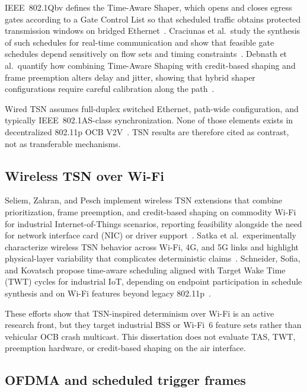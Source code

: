 IEEE~802.1Qbv defines the Time-Aware Shaper, which opens and closes egress gates according to a Gate Control List so that scheduled traffic obtains protected transmission windows on bridged Ethernet~\cite{ieee8021qbv}.
Craciunas et al.\ study the synthesis of such schedules for real-time communication and show that feasible gate schedules depend sensitively on flow sets and timing constraints~\cite{craciunas2016}.
Debnath et al.\ quantify how combining Time-Aware Shaping with credit-based shaping and frame preemption alters delay and jitter, showing that hybrid shaper configurations require careful calibration along the path~\cite{debnath2023mixed,modeling}.

Wired TSN assumes full-duplex switched Ethernet, path-wide configuration, and typically IEEE~802.1AS-class synchronization.
None of those elements exists in decentralized 802.11p OCB V2V~\cite{jiang2008ieee80211p,ieee8021qbv}.
TSN results are therefore cited as contrast, not as transferable mechanisms.

\subsection{Wireless TSN over Wi-Fi}
\label{sec:rw:wireless-tsn}

Seliem, Zahran, and Pesch implement wireless TSN extensions that combine prioritization, frame preemption, and credit-based shaping on commodity Wi-Fi for industrial Internet-of-Things scenarios, reporting feasibility alongside the need for network interface card (NIC) or driver support~\cite{seliem2023wirelesstsn}.
Satka et al.\ experimentally characterize wireless TSN behavior across Wi-Fi, 4G, and 5G links and highlight physical-layer variability that complicates deterministic claims~\cite{satka2023wireless}.
Schneider, Sofia, and Kovatsch propose time-aware scheduling aligned with Target Wake Time (TWT) cycles for industrial IoT, depending on endpoint participation in schedule synthesis and on Wi-Fi features beyond legacy 802.11p~\cite{schneider2022twt}.

These efforts show that TSN-inspired determinism over Wi-Fi is an active research front, but they target industrial BSS or Wi-Fi~6 feature sets rather than vehicular OCB crash multicast.
This dissertation does not evaluate TAS, TWT, preemption hardware, or credit-based shaping on the air interface.

\subsection{OFDMA and scheduled trigger frames}
\label{sec:rw:ofdma}

